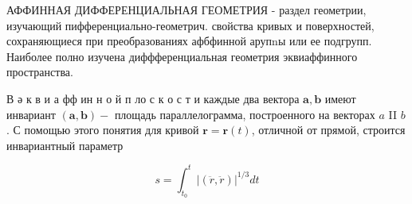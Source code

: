 \documentclass[10pt]{article}
\begin{document}
АФФИННАЯ ДИФФЕРЕНЦИАЛЬНАЯ ГЕОМЕТРИЯ - раздел геометрии, изучающий пифференциально-геометрич. свойства кривых и поверхностей, сохраняющиеся при преобразованиях афбфинной арупnы или ее подгрупп. Наиболее полно изучена диффференциальная геометрия эквиаффинного пространства.



В $ә$ к в и а фф ин н о й п ло с к о с т и каждые два вектора $\boldsymbol{a}, \boldsymbol{b}$ имеют инвариант $(\boldsymbol{a}, \boldsymbol{b})-$ площадь параллелограмма, построенного на векторах $a$ II $b$. С помощью этого понятия для кривой $\boldsymbol{r}=\boldsymbol{r}(t)$, отличной от прямой, строится инвариантный параметр



\[

s=\int_{t_{0}}^{t}|(\ddot{r}, \ddot{r})|^{1 / 3} d t

\]
\end{document}
